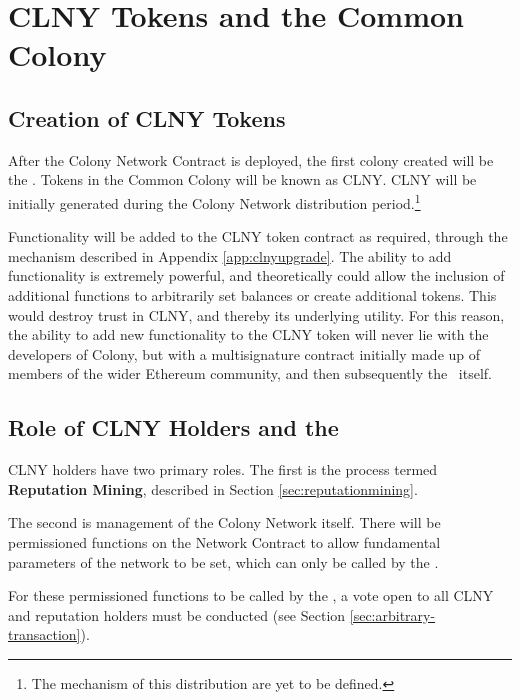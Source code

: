 \section{CLNY Tokens and the Common Colony}\label{sec:clny}

\subsection{Creation of CLNY Tokens}
After the Colony Network Contract is deployed, the first colony created will be the \rc. Tokens in the Common Colony will be known as CLNY. CLNY will be initially generated during the Colony Network distribution period.\footnote{The mechanism of this distribution are yet to be defined.} %
 
Functionality will be added to the CLNY token contract as required, through the  mechanism described in Appendix \ref{app:clnyupgrade}. The ability to add functionality is extremely powerful, and theoretically could allow the inclusion of additional functions to arbitrarily set balances or create additional tokens. This would destroy trust in CLNY, and thereby its underlying utility. For this reason, the ability to add new functionality to the CLNY token will never lie with the developers of Colony, but with a multisignature contract initially made up of members of the wider Ethereum community, and then subsequently the \rc\ itself.

\subsection{Role of CLNY Holders and the \rc}
CLNY holders have two primary roles. The first is the process termed \textbf{Reputation Mining}, described in Section \ref{sec:reputationmining}.

The second is management of the Colony Network itself. There will be permissioned functions on the Network Contract to allow fundamental parameters of the network to be set, which can only be called by the \rc.

For these permissioned functions to be called by the \rc, a vote open to all CLNY and reputation holders must be conducted  (see Section \ref{sec:arbitrary-transaction}).

